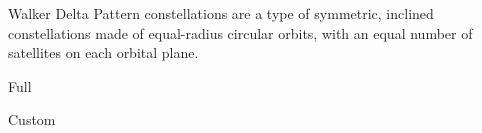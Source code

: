 
Walker Delta Pattern constellations are a type of symmetric, inclined constellations made of equal-radius circular orbits, with an equal number of satellites on each orbital plane.

{Full}

{Custom}
